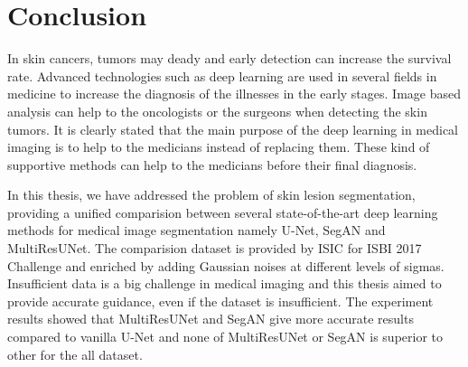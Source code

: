\chapter{Conclusion}

    In skin cancers, tumors may deady and early detection can increase the survival rate.
    Advanced technologies such as deep learning are used in several fields in medicine to increase the diagnosis of the illnesses in the early stages.
    Image based analysis can help to the oncologists or the surgeons when detecting the skin tumors.
    It is clearly stated that the main purpose of the deep learning in medical imaging is to help to the medicians instead of replacing them.
    These kind of supportive methods can help to the medicians before their final diagnosis.

    In this thesis, we have addressed the problem of skin lesion segmentation, providing a unified comparision between several  state-of-the-art deep learning methods
    for medical image segmentation namely U-Net, SegAN and MultiResUNet.
    The comparision dataset is provided by ISIC for ISBI 2017 Challenge and enriched by adding Gaussian noises at different levels of sigmas.
    Insufficient data is a big challenge in medical imaging and this thesis aimed to provide accurate guidance, even if the dataset is insufficient.
    The experiment results showed that MultiResUNet and SegAN give more accurate results compared to vanilla U-Net and none of MultiResUNet or SegAN is superior to other for the all dataset.
